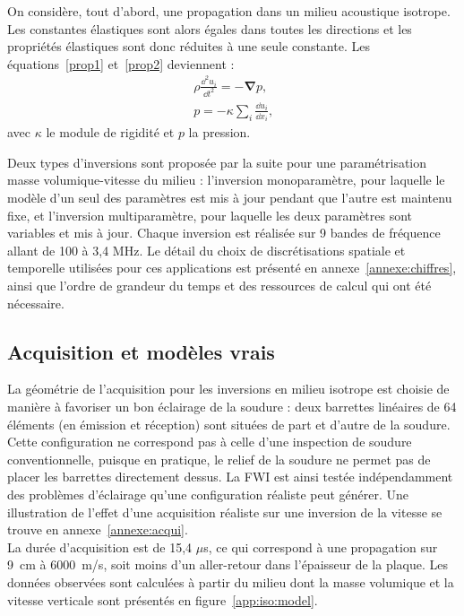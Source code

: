 On considère, tout d'abord, une propagation dans un milieu acoustique isotrope. Les constantes élastiques sont alors égales dans toutes les directions et les propriétés élastiques sont donc réduites à une seule constante. Les équations~\ref{prop1} et~\ref{prop2} deviennent : 
\begin{eqnarray}
	\rho \frac{\dd^2 u_{i}}{\dd t^2} = -\bm{\nabla} p \text{,}\\
	p=-\kappa \displaystyle\sum_{i} \frac{\dd u_{i}}{\dd x_{i}}\text{,}
\end{eqnarray}
avec $\kappa$ le module de rigidité et $p$ la pression.

Deux types d'inversions sont proposée par la suite pour une paramétrisation masse volumique-vitesse du milieu : l'inversion monoparamètre, pour laquelle le modèle d'un seul des paramètres est mis à jour pendant que l'autre est maintenu fixe, et l'inversion multiparamètre, pour laquelle les deux paramètres sont variables et mis à jour. Chaque inversion est réalisée sur 9 bandes de fréquence allant de 100 à 3,4 MHz. Le détail du choix de discrétisations spatiale et temporelle utilisées pour ces applications est présenté en annexe~\ref{annexe:chiffres}, ainsi que l'ordre de grandeur du temps et des ressources de calcul qui ont été nécessaire.

\subsection{Acquisition et modèles vrais}

La géométrie de l'acquisition pour les inversions en milieu isotrope est choisie de manière à favoriser un bon éclairage de la soudure : deux barrettes linéaires de 64 éléments (en émission et réception) sont situées de part et d'autre de la soudure. Cette configuration ne correspond pas à celle d'une inspection de soudure conventionnelle, puisque en pratique, le relief de la soudure ne permet pas de placer les barrettes directement dessus. La FWI est ainsi testée indépendamment des problèmes d'éclairage qu'une configuration réaliste peut générer. Une illustration de l'effet d'une acquisition réaliste sur une inversion de la vitesse se trouve en annexe~\ref{annexe:acqui}.\\

  La durée d'acquisition est de 15,4 $\mu$s, ce qui correspond à une propagation sur 9~cm à 6000~m/s, soit moins d'un aller-retour dans l'épaisseur de la plaque. Les données observées sont calculées à partir du milieu dont la masse volumique et  la vitesse verticale sont présentés en figure~\ref{app:iso:model}.\\



